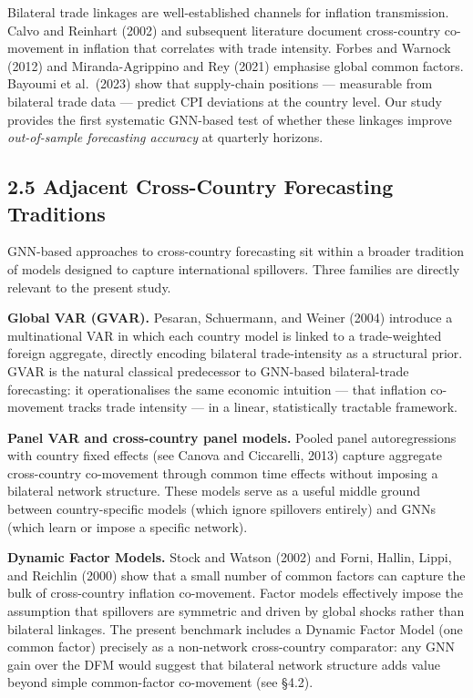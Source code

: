 \documentclass[
]{article}
\begin{document}
Bilateral trade linkages are well-established channels for inflation
transmission. Calvo and Reinhart (2002) and subsequent literature
document cross-country co-movement in inflation that correlates with
trade intensity. Forbes and Warnock (2012) and Miranda-Agrippino and Rey
(2021) emphasise global common factors. Bayoumi et al.~(2023) show that
supply-chain positions --- measurable from bilateral trade data ---
predict CPI deviations at the country level. Our study provides the
first systematic GNN-based test of whether these linkages improve
\emph{out-of-sample forecasting accuracy} at quarterly horizons.

\subsection{2.5 Adjacent Cross-Country Forecasting Traditions}\label{adjacent-cross-country-forecasting-traditions}

GNN-based approaches to cross-country forecasting sit within a broader tradition of models designed to capture international spillovers. Three families are directly relevant to the present study.

\textbf{Global VAR (GVAR).} Pesaran, Schuermann, and Weiner (2004) introduce a multinational VAR in which each country model is linked to a trade-weighted foreign aggregate, directly encoding bilateral trade-intensity as a structural prior. GVAR is the natural classical predecessor to GNN-based bilateral-trade forecasting: it operationalises the same economic intuition --- that inflation co-movement tracks trade intensity --- in a linear, statistically tractable framework.

\textbf{Panel VAR and cross-country panel models.} Pooled panel autoregressions with country fixed effects (see Canova and Ciccarelli, 2013) capture aggregate cross-country co-movement through common time effects without imposing a bilateral network structure. These models serve as a useful middle ground between country-specific models (which ignore spillovers entirely) and GNNs (which learn or impose a specific network).

\textbf{Dynamic Factor Models.} Stock and Watson (2002) and Forni, Hallin, Lippi, and Reichlin (2000) show that a small number of common factors can capture the bulk of cross-country inflation co-movement. Factor models effectively impose the assumption that spillovers are symmetric and driven by global shocks rather than bilateral linkages. The present benchmark includes a Dynamic Factor Model (one common factor) precisely as a non-network cross-country comparator: any GNN gain over the DFM would suggest that bilateral network structure adds value beyond simple common-factor co-movement (see \S4.2).
\end{document}
